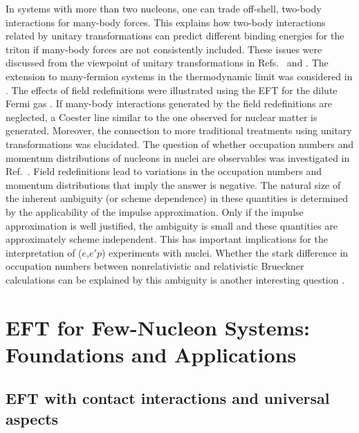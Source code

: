 \documentclass[aps,rmp,nofootinbib,twocolumn,floatfix]{revtex4}
\begin{document}
In systems with more than two nucleons, one can trade off-shell, two-body
interactions for many-body forces.
This explains how two-body interactions related by unitary transformations
can predict different binding energies for the triton \cite{ARNAN73}
if many-body forces are not consistently included.
These issues were discussed from the viewpoint of unitary transformations
in Refs.~\cite{POLYZOU90} and \cite{AMGHAR95}.
The extension to many-fermion systems in the thermodynamic limit was
considered in \cite{Furnstahl:2000we}. The effects of field redefinitions 
were
illustrated using the EFT for the dilute Fermi gas \cite{Hammer:2000xg}. 
If many-body interactions generated by the field redefinitions are neglected,
a Coester line similar to the one observed for
nuclear matter \cite{COESTER70} is generated. 
Moreover, the connection to more traditional treatments using unitary 
transformations was elucidated.
The question of whether occupation numbers and momentum distributions of 
nucleons in nuclei are observables 
was investigated in Ref.~\cite{Furnstahl:2001xq}. 
Field redefinitions lead to variations in the occupation numbers
and momentum distributions that imply the answer is negative.
The natural size of the inherent ambiguity (or scheme dependence)
in these quantities is determined by the applicability of the 
impulse approximation. Only if the impulse approximation is well justified,
the ambiguity is small and these quantities are approximately scheme
independent. This has important  implications for the interpretation 
of ($e$,$e'p$) experiments with nuclei. Whether the stark difference in 
occupation numbers between nonrelativistic and relativistic Brueckner
calculations can be explained by this ambiguity is another interesting
question \cite{Jaminon:1990zz}.



\section{EFT for Few-Nucleon Systems: Foundations and Applications}
\def\theequation{\arabic{section}.\arabic{equation}}
\setcounter{equation}{0}
\label{sec:EFT}


\subsection{EFT with contact interactions and universal aspects}
\label{sec:EFTfoundations}
\end{document}

